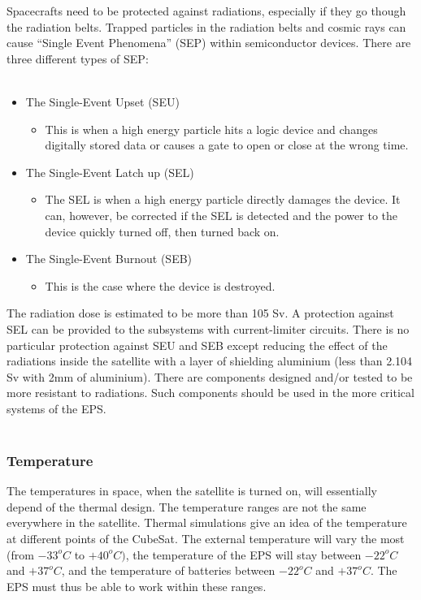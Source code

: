 Spacecrafts need to be protected against radiations, especially if they go though the radiation belts. Trapped particles in the radiation belts and cosmic rays can cause “Single Event Phenomena” (SEP) within semiconductor devices. There are three different types of SEP:
\\ \\
\begin{itemize}
\item The Single-Event Upset (SEU)
\begin{itemize}
\item This is when a high energy particle hits a logic device and changes digitally stored data or causes a gate to open or close at the wrong time.
\end{itemize}
\item The Single-Event Latch up (SEL)
\begin{itemize}
\item The SEL is when a high energy particle directly damages the device. It can, however, be corrected if the SEL is detected and the power to the device quickly turned off, then turned back on.
\end{itemize}
\item The Single-Event Burnout (SEB)
\begin{itemize}
\item This is the case where the device is destroyed.
\end{itemize}

\end{itemize}


The radiation dose is estimated to be more than 105 Sv. A protection against SEL can be provided to the subsystems with current-limiter circuits. There is no particular protection against SEU and SEB except reducing the effect of the radiations inside the satellite with a layer of shielding aluminium (less than 2.104 Sv with 2mm of aluminium). There are components designed and/or tested to be more resistant to radiations. Such components should be used in the more critical systems of the EPS.
\\ \\
\subsubsection*{Temperature}

The temperatures in space, when the satellite is turned on, will essentially depend of the thermal design. The temperature ranges are not the same everywhere in the satellite. Thermal simulations give an idea of the temperature at different points of the CubeSat. The external temperature will vary the most (from $-33^{o}C$ to $+40^{o}C)$, the temperature of the EPS will stay between $-22^{o}C$ and $+37^{o}C$, and the temperature of batteries between $-22^{o}C$ and $+37^{o}C$. The EPS must thus be able to work within these ranges.

